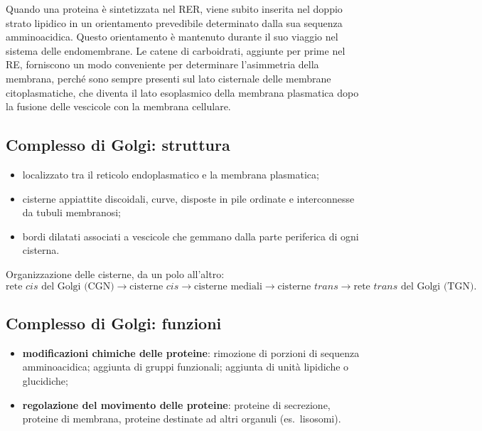 Quando una proteina è sintetizzata nel RER, viene subito inserita nel doppio strato lipidico in un orientamento prevedibile determinato dalla sua sequenza amminoacidica. Questo orientamento è mantenuto durante il suo viaggio nel sistema delle endomembrane. Le catene di carboidrati, aggiunte per prime nel RE, forniscono un modo conveniente per determinare l'asimmetria della membrana, perché sono sempre presenti sul lato cisternale delle membrane citoplasmatiche, che diventa il lato esoplasmico della membrana plasmatica dopo la fusione delle vescicole con la membrana cellulare.

\subsection{Complesso di Golgi: struttura}

\begin{itemize}
  \item localizzato tra il reticolo endoplasmatico e la membrana plasmatica;
  \item cisterne appiattite discoidali, curve, disposte in pile ordinate e interconnesse da tubuli membranosi;
  \item bordi dilatati associati a vescicole che gemmano dalla parte periferica di ogni cisterna.
\end{itemize}

Organizzazione delle cisterne, da un polo all'altro:
\[
\text{rete } cis \text{ del Golgi (CGN)} \rightarrow \text{cisterne } cis \rightarrow \text{cisterne mediali} \rightarrow \text{cisterne } trans \rightarrow \text{rete } trans \text{ del Golgi (TGN)}.
\]

\subsection{Complesso di Golgi: funzioni}

\begin{itemize}
  \item \textbf{modificazioni chimiche delle proteine}: rimozione di porzioni di sequenza amminoacidica; aggiunta di gruppi funzionali; aggiunta di unità lipidiche o glucidiche;
  \item \textbf{regolazione del movimento delle proteine}: proteine di secrezione, proteine di membrana, proteine destinate ad altri organuli (es.\ lisosomi).
\end{itemize}

